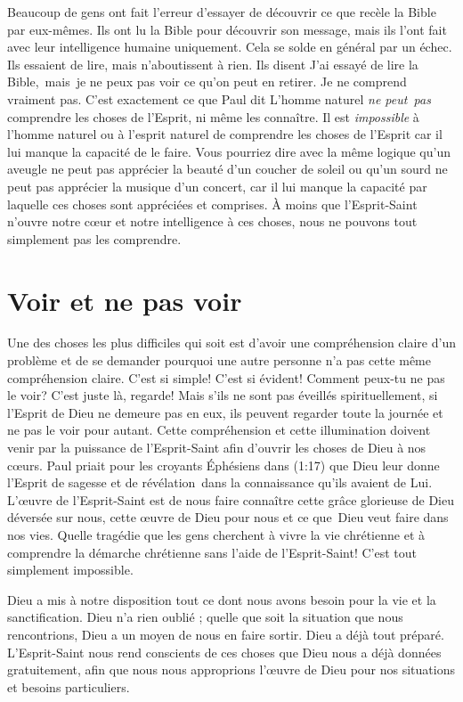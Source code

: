 Beaucoup de gens ont fait l'erreur d'essayer de découvrir ce que recèle
 la Bible par eux-mêmes. Ils ont lu la Bible pour découvrir son message,
 mais ils l'ont fait avec leur intelligence humaine uniquement.
 Cela se solde en général par un échec. Ils essaient de lire,
 mais n'aboutissent à rien. Ils disent\frcolon{}
 \Og J'ai essayé de lire la Bible,~mais~je ne peux pas voir ce qu'on peut
 en retirer. Je ne comprend vraiment pas. \Fg{}
 C'est exactement ce que Paul dit\frcolon{}
 \Og L'homme naturel \emph{ne peut~pas} comprendre les choses de l'Esprit,
 ni même les connaître. \Fg{}
 Il est \emph{impossible} à l'homme naturel ou à l'esprit naturel
 de comprendre les choses de l'Esprit car il lui manque la capacité
 de le faire. Vous pourriez dire avec la même logique qu'un aveugle
 ne peut pas apprécier la beauté d'un coucher de soleil ou qu'un sourd
 ne peut pas apprécier la musique d'un concert, car il lui manque la capacité
 par laquelle ces choses sont appréciées et comprises.
 À moins que l'Esprit-Saint n'ouvre notre cœur et notre intelligence à ces choses,
 nous ne pouvons tout simplement pas les comprendre.


\section{Voir et ne pas voir}

Une des choses les plus difficiles qui soit est d'avoir une compréhension
 claire d'un problème et de se demander pourquoi une autre personne
 n'a pas cette même compréhension claire. C'est si simple!
 C'est si évident! Comment peux-tu ne pas le voir?
 C'est juste là, regarde! Mais s'ils ne sont pas éveillés spirituellement,
 si l'Esprit de Dieu ne demeure pas en eux, ils peuvent regarder
 toute la journée et ne pas le voir pour autant.
 Cette compréhension et cette illumination doivent venir par la puissance
 de l'Esprit-Saint afin d'ouvrir les choses de Dieu à nos cœurs.
 Paul priait pour les croyants Éphésiens dans (1:17)
 que Dieu leur donne l'Esprit de sagesse et de révélation~dans la
 connaissance qu'ils avaient de Lui.
 L'œuvre de l'Esprit-Saint est de nous faire
 connaître cette grâce glorieuse de Dieu déversée sur nous,
 cette œuvre de Dieu pour nous et ce que~Dieu veut faire dans nos vies.
 Quelle tragédie que les gens cherchent à vivre la vie chrétienne
 et à comprendre la démarche chrétienne sans l'aide de l'Esprit-Saint!
 C'est tout simplement impossible.

Dieu a mis à notre disposition tout ce dont nous avons besoin pour la vie
 et la sanctification. Dieu n'a rien oublié ; quelle que soit la situation
 que nous rencontrions, Dieu a un moyen de nous en faire sortir.
 Dieu a déjà tout préparé. L'Esprit-Saint nous rend conscients
 de ces choses que Dieu nous a déjà données gratuitement,
 afin que nous nous approprions l'œuvre de Dieu pour nos
 situations et besoins particuliers.

